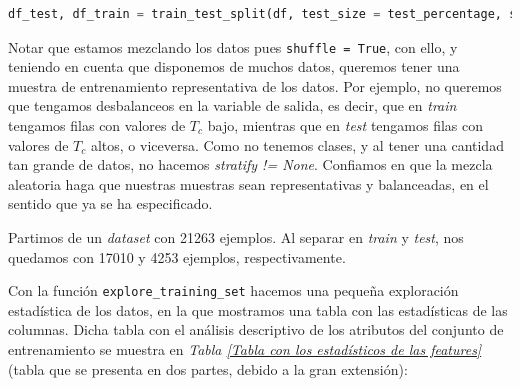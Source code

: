 \documentclass[11pt]{article}
\begin{document}
\begin{lstlisting}[language=Python]
    df_test, df_train = train_test_split(df, test_size = test_percentage, shuffle = True, stratify = None)
\end{lstlisting}

Notar que estamos mezclando los datos pues \lstinline{shuffle = True}, con ello, y teniendo en cuenta que disponemos de muchos datos, queremos tener una muestra de entrenamiento representativa de los datos. Por ejemplo, no queremos que tengamos desbalanceos en la variable de salida, es decir, que en \emph{train} tengamos filas con valores de $T_c$ bajo, mientras que en \emph{test} tengamos filas con valores de $T_c$ altos, o viceversa. Como no tenemos clases, y al tener una cantidad tan grande de datos, no hacemos \emph{stratify != None}. Confiamos en que la mezcla aleatoria haga que nuestras muestras sean representativas y balanceadas, en el sentido que ya se ha especificado.

Partimos de un \emph{dataset} con 21263 ejemplos. Al separar en \emph{train} y \emph{test}, nos quedamos con 17010 y 4253 ejemplos, respectivamente.

Con la función \lstinline{explore_training_set} hacemos una pequeña exploración estadística de los datos, en la que mostramos una tabla con las estadísticas de las columnas. Dicha tabla con el análisis descriptivo de los atributos del conjunto de entrenamiento se muestra en \emph{Tabla \ref{Tabla con los estadísticos de las features}} (tabla que se presenta en dos partes, debido a la gran extensión):
\end{document}
